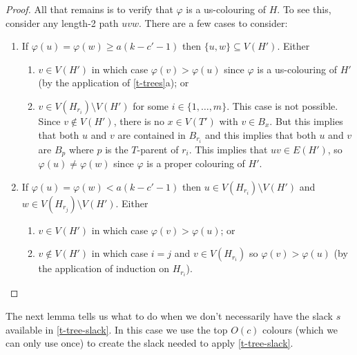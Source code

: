\documentclass[kpfonts]{patmorin}
\theoremstyle{named}
\newcommand{\weirdref}[2]{\cref{#1}#2}
\begin{document}
\begin{proof}
   All that remains is to verify that $\varphi$ is a us-colouring of $H$. To see this, consider any length-2 path $uvw$.  There are a few cases to consider:
   \begin{enumerate}
    \item If $\varphi(u)=\varphi(w) \ge a(k-c'-1)$ then $\{u,w\}\subseteq V(H')$. Either
    \begin{enumerate}
       \item $v\in V(H')$ in which case $\varphi(v)>\varphi(u)$ since $\varphi$ is a us-colouring of $H'$ (by the application of \weirdref{t-trees}{a}); or
       \item $v\in V(H_{r_i})\setminus V(H')$ for some $i\in\{1,\ldots,m\}$.  This case is not possible.  Since $v\not\in V(H')$, there is no $x\in V(T')$ with $v\in B_x$.  But this implies that both $u$ and $v$ are contained in $B_{r_i}$ and this implies that both $u$ and $v$ are $B_p$ where $p$ is the $T$-parent of $r_i$.  This implies that $uv\in E(H')$, so $\varphi(u)\neq\varphi(w)$ since $\varphi$ is a proper colouring of $H'$.
   \end{enumerate}
   \item If $\varphi(u)=\varphi(w) < a(k-c'-1)$ then $u\in V(H_{r_i})\setminus V(H')$ and $w\in V(H_{r_j})\setminus V(H')$.  Either
   \begin{enumerate}
    \item $v\in V(H')$ in which case $\varphi(v)>\varphi(u)$; or
    \item $v\not\in V(H')$ in which case $i=j$ and $v\in V(H_{r_i})$ so $\varphi(v)>\varphi(u)$ (by the application of induction on $H_{r_i}$). \qedhere
    \end{enumerate}
   \end{enumerate}
\end{proof}

The next lemma tells us what to do when we don't necessarily have the slack $s$ available in \cref{t-tree-slack}.  In this case we use the top $O(c)$ colours (which we can only use once) to create the slack needed to apply \cref{t-tree-slack}.
\end{document}
